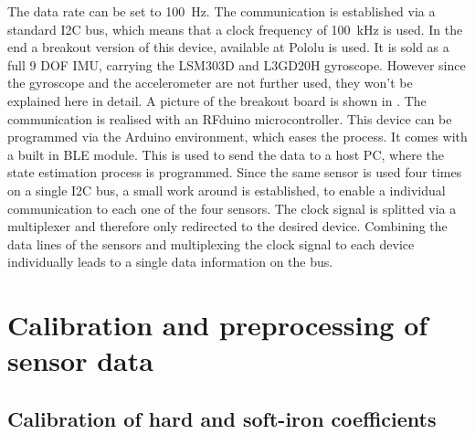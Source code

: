 The data rate can be set to \SI{100}{\Hz}. The communication is established via a standard I2C bus, which means that a clock frequency of \SI{100}{\kilo \Hz} is used. In the end a breakout version of this device, available at Pololu  is used. It is sold as a full 9 \ac{DOF} IMU, carrying the LSM303D and L3GD20H gyroscope. However since the gyroscope and the accelerometer are not further used, they won't be explained here in detail. A picture of the breakout board is shown in . The communication is realised with an RFduino microcontroller. This device can be programmed via the Arduino environment, which eases the process. It comes with a built in \ac{BLE} module. This is used to send the data to a host PC, where the state estimation process is programmed. Since the same sensor is used four times on a single I2C bus, a small work around is established, to enable a individual communication to each one of the four sensors. The clock signal is splitted via a multiplexer and therefore only redirected to the desired device. Combining the data lines of the sensors and multiplexing the clock signal to each device individually leads to a single data information on the bus.



\section{Calibration and preprocessing of sensor data}

\subsection{Calibration of hard and soft-iron coefficients}

